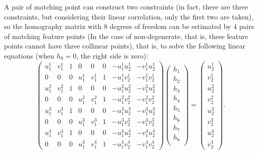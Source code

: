 A pair of matching point can construct two constraints (in fact, there are three constraints, but considering their linear correlation, only the first two are taken), so the homography matrix with 8 degrees of freedom can be estimated by 4 pairs of matching feature points (In the case of non-degenerate, that is, these feature points cannot have three collinear points), that is, to solve the following linear equations (when $h_9 = 0$, the right side is zero):
\begin{equation}
\begin{pmatrix}
u_{1}^{1}& v_{1}^{1}& 1 & 0 & 0 & 0 & -u_{1}^{1}u_{2}^{1} & -v_{1}^{1}u_{2}^{1}\\
0 & 0 & 0& u_{1}^{1}& v_{1}^{1}& 1 &  -u_{1}^{1}v_{2}^{1} & -v_{1}^{1}v_{2}^{1}\\
u_{1}^{2}& v_{1}^{2}& 1 & 0 & 0 & 0 & -u_{1}^{2}u_{2}^{2} & -v_{1}^{2}u_{2}^{2}\\
0 & 0 & 0& u_{1}^{2}& v_{1}^{2}& 1 &  -u_{1}^{2}v_{2}^{2} & -v_{1}^{2}v_{2}^{2}\\
u_{1}^{3}& v_{1}^{3}& 1 & 0 & 0 & 0 & -u_{1}^{3}u_{2}^{3} & -v_{1}^{3}u_{2}^{3}\\
0 & 0 & 0& u_{1}^{3}& v_{1}^{3}& 1 &  -u_{1}^{3}v_{2}^{3} & -v_{1}^{3}v_{2}^{3}\\
u_{1}^{4}& v_{1}^{4}& 1 & 0 & 0 & 0 & -u_{1}^{4}u_{2}^{4} & -v_{1}^{4}u_{2}^{4}\\
0 & 0 & 0& u_{1}^{4}& v_{1}^{4}& 1 &  -u_{1}^{4}v_{2}^{4} & -v_{1}^{4}v_{2}^{4}
\end{pmatrix}
\begin{pmatrix}
 h_{1}\\h_{2}\\h_{3}\\ h_{4}\\h_{5}\\h_{6}\\ h_{7}\\h_{8}\\  
\end{pmatrix}
=
\begin{pmatrix}
u_{2}^{1}\\ v_{2}^{1}\\ u_{2}^{2}\\ v_{2}^{2}\\u_{2}^{3}\\ v_{2}^{3}\\u_{2}^{4}\\ v_{2}^{4}
\end{pmatrix}.
\end{equation}

